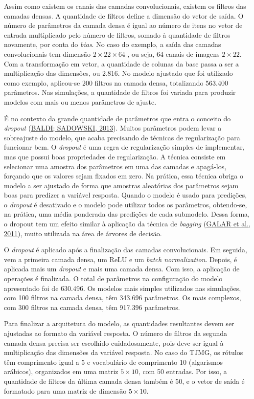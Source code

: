 \documentclass[12pt,twoside,brazilian]{book}
\begin{document}
Assim como existem os canais das camadas convolucionais, existem os
filtros das camadas densas. A quantidade de filtros define a dimensão do
vetor de saída. O número de parâmetros da camada densa é igual ao número
de itens no vetor de entrada multiplicado pelo número de filtros, somado
à quantidade de filtros novamente, por conta do \emph{bias}. No caso do
exemplo, a saída das camadas convolucionais tem dimensão
\(2\times22\times64\) , ou seja, 64 canais de imagens \(2\times 22\).
Com a transformação em vetor, a quantidade de colunas da base passa a
ser a multiplicação das dimensões, ou 2.816. No modelo ajustado que foi
utilizado como exemplo, aplicou-se 200 filtros na camada densa,
totalizando 563.400 parâmetros. Nas simulações, a quantidade de filtros
foi variada para produzir modelos com mais ou menos parâmetros de
ajuste.

É no contexto da grande quantidade de parâmetros que entra o conceito do
\emph{dropout} (\protect\hyperlink{ref-baldi2013}{BALDI; SADOWSKI,
2013}). Muitos parâmetros podem levar a sobreajuste do modelo, que acaba
precisando de técnicas de regularização para funcionar bem. O
\emph{dropout} é uma regra de regularização simples de implementar, mas
que possui boas propriedades de regularização. A técnica consiste em
selecionar uma amostra dos parâmetros em uma das camadas e apagá-los,
forçando que os valores sejam fixados em zero. Na prática, essa técnica
obriga o modelo a ser ajustado de forma que amostras aleatórias dos
parâmetros sejam boas para predizer a variável resposta. Quando o modelo
é usado para predições, o \emph{dropout} é desativado e o modelo pode
utilizar todos os parâmetros, obtendo-se, na prática, uma média
ponderada das predições de cada submodelo. Dessa forma, o dropout tem um
efeito similar à aplicação da técnica de \emph{bagging}
(\protect\hyperlink{ref-galar2011}{GALAR et al., 2011}), muito utilizada
na área de árvores de decisão.

O \emph{dropout} é aplicado após a finalização das camadas
convolucionais. Em seguida, vem a primeira camada densa, um ReLU e um
\emph{batch normalization}. Depois, é aplicada mais um \emph{dropout} e
mais uma camada densa. Com isso, a aplicação de operações é finalizada.
O total de parâmetros na configuração do modelo apresentado foi de
630.496. Os modelos mais simples utilizados nas simulações, com 100
filtros na camada densa, têm 343.696 parâmetros. Os mais complexos, com
300 filtros na camada densa, têm 917.396 parâmetros.

Para finalizar a arquitetura do modelo, as quantidades resultantes devem
ser ajustadas ao formato da variável resposta. O número de filtros da
segunda camada densa precisa ser escolhido cuidadosamente, pois deve ser
igual à multiplicação das dimensões da variável resposta. No caso do
TJMG, os rótulos têm comprimento igual a 5 e vocabulário de comprimento
10 (algarismos arábicos), organizados em uma matriz \(5\times10\), com
50 entradas. Por isso, a quantidade de filtros da última camada densa
também é 50, e o vetor de saída é formatado para uma matriz de dimensão
\(5\times10\).
\end{document}
